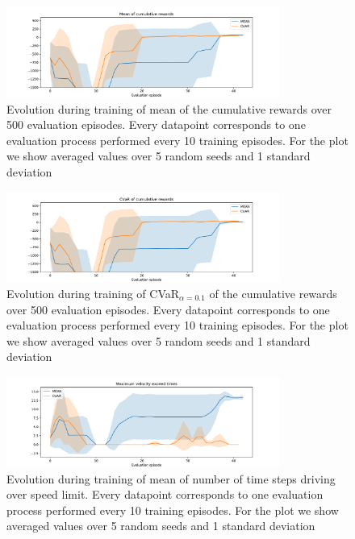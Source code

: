 \begin{figure}[ht]
        \centering
        \includegraphics[width=0.8\textwidth]{images/Car/CVAR/mean_train_withstds.pdf}
        \caption{Evolution during training of mean of the cumulative rewards over 500 evaluation episodes.
        Every datapoint corresponds
        to one evaluation process performed every 10 training episodes. For the plot we
        show averaged values over 5 random seeds and 1 standard deviation}
        \label{fig:mean_car}
    
\end{figure}

\begin{figure}[ht]
        \centering
        \includegraphics[width=0.8\textwidth]{images/Car/CVAR/cvar_train_withstds.pdf}
        \caption{Evolution during training of CVaR$_{\alpha=0.1}$ of the cumulative rewards over 500 evaluation episodes.
        Every datapoint corresponds
        to one evaluation process performed every 10 training episodes.
        For the plot we
        show averaged values over 5 random seeds and 1 standard deviation}
        \label{fig:cvar_car}
    
\end{figure}

\begin{figure}[ht]
        \centering
        \includegraphics[width=0.8\textwidth]{images/Car/CVAR/times_exceedvel_withstds.pdf}
        \caption{Evolution during training of mean of number of time steps driving over speed limit.
        Every datapoint corresponds
        to one evaluation process performed every 10 training episodes. For the plot we
        show averaged values over 5 random seeds and 1 standard deviation}
        \label{fig:maxveltimes_car}
    
\end{figure}

